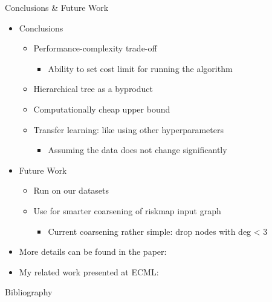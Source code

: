 \documentclass[10pt]{beamer}
\begin{document}
\begin{frame}{Conclusions \& Future Work}
    \begin{itemize}
        \item Conclusions
        \begin{itemize}
            \item Performance-complexity trade-off
            \begin{itemize}
                \item Ability to set cost limit for running the algorithm
            \end{itemize}
            \item Hierarchical tree as a byproduct
            \item Computationally cheap upper bound
            \item Transfer learning: like using other hyperparameters
            \begin{itemize}
                \item Assuming the data does not change significantly
            \end{itemize}
        \end{itemize}
        
        \item Future Work
        \begin{itemize}
            \item Run on our datasets
            \item Use for smarter coarsening of riskmap input graph
            \begin{itemize}
                \item Current coarsening rather simple: drop nodes with deg < 3  
            \end{itemize}
        \end{itemize}
        
    \item More details can be found in the paper: \cite{prochazka_scalable_2022}
    \item My related work presented at ECML: \cite{dedic_adaptive_2022}
    \end{itemize}
\end{frame}

\begin{frame}[allowframebreaks, shrink=12]{Bibliography}
    \printbibliography
\end{frame}

\begin{frame}
	\titlepage
\end{frame}
\end{document}
